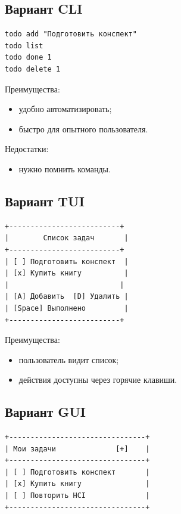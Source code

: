 \documentclass[12pt,a4paper]{article}
\begin{document}
\subsection{Вариант CLI}

\begin{lstlisting}
todo add "Подготовить конспект"
todo list
todo done 1
todo delete 1
\end{lstlisting}

Преимущества:
\begin{itemize}
    \item удобно автоматизировать;
    \item быстро для опытного пользователя.
\end{itemize}

Недостатки:
\begin{itemize}
    \item нужно помнить команды.
\end{itemize}

\subsection{Вариант TUI}

\begin{lstlisting}
+--------------------------+
|        Список задач       |
+--------------------------+
| [ ] Подготовить конспект  |
| [x] Купить книгу          |
|                          |
| [A] Добавить  [D] Удалить |
| [Space] Выполнено         |
+--------------------------+
\end{lstlisting}

Преимущества:
\begin{itemize}
    \item пользователь видит список;
    \item действия доступны через горячие клавиши.
\end{itemize}

\subsection{Вариант GUI}

\begin{lstlisting}
+--------------------------------+
| Мои задачи              [+]    |
+--------------------------------+
| [ ] Подготовить конспект       |
| [x] Купить книгу               |
| [ ] Повторить HCI              |
+--------------------------------+
\end{lstlisting}
\end{document}

